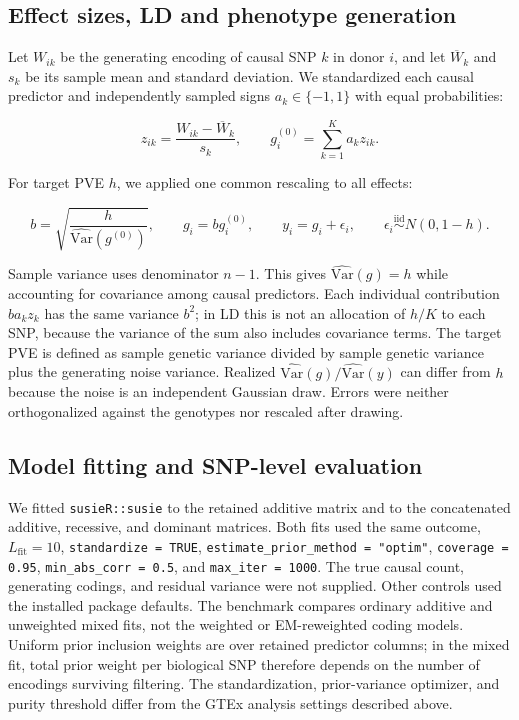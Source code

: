 \documentclass[12pt]{article}
\begin{document}
\subsection{Effect sizes, LD and phenotype generation}

Let $W_{ik}$ be the generating encoding of causal SNP $k$ in donor $i$,
and let $\overline{W}_k$ and $s_k$ be its sample mean and standard
deviation. We standardized each causal predictor and independently
sampled signs $a_k\in\{-1,1\}$ with equal probabilities:

\begin{equation}
z_{ik}=\frac{W_{ik}-\overline{W}_k}{s_k},\qquad
 g_i^{(0)}=\sum_{k=1}^{K}a_k z_{ik}.
\end{equation}

For target PVE $h$, we applied one common rescaling to all effects:

\begin{equation}
b=\sqrt{\frac{h}{\widehat{\mathrm{Var}}(g^{(0)})}},\qquad
 g_i=b g_i^{(0)},\qquad y_i=g_i+\epsilon_i,\qquad
 \epsilon_i\stackrel{\mathrm{iid}}{\sim}N(0,1-h).
\end{equation}

Sample variance uses denominator $n-1$. This gives
$\widehat{\mathrm{Var}}(g)=h$ while accounting for covariance among
causal predictors. Each individual contribution $b a_k z_k$ has the
same variance $b^2$; in LD this is not an allocation of $h/K$ to each
SNP, because the variance of the sum also includes covariance terms.
The target PVE is defined as sample genetic variance divided by sample
genetic variance plus the generating noise variance. Realized
$\widehat{\mathrm{Var}}(g)/\widehat{\mathrm{Var}}(y)$ can differ from
$h$ because the noise is an independent Gaussian draw. Errors were
neither orthogonalized against the genotypes nor rescaled after drawing.

\subsection{Model fitting and SNP-level evaluation}

We fitted \texttt{susieR::susie} to the retained additive matrix and to
the concatenated additive, recessive, and dominant matrices. Both fits
used the same outcome, $L_{\mathrm{fit}}=10$,
\texttt{standardize = TRUE}, \texttt{estimate\_prior\_method = "optim"},
\texttt{coverage = 0.95}, \texttt{min\_abs\_corr = 0.5}, and
\texttt{max\_iter = 1000}. The true causal count, generating codings,
and residual variance were not supplied. Other controls used the
installed package defaults. The benchmark compares ordinary additive
and unweighted mixed fits, not the weighted or EM-reweighted coding
models. Uniform prior inclusion weights are over retained predictor
columns; in the mixed fit, total prior weight per biological SNP
therefore depends on the number of encodings surviving filtering.
The standardization, prior-variance optimizer, and purity threshold
differ from the GTEx analysis settings described above.
\end{document}
